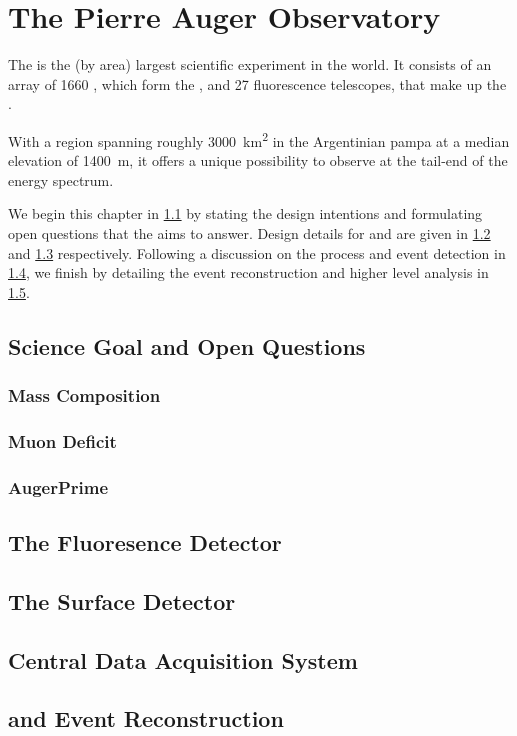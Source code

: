 
\chapter[The Pierre Auger Observatory]{The Pierre Auger Observatory}
\label{chap:pierre-auger-observatory}

The \PAO is the (by area) largest scientific experiment in the world. It 
consists of an array of 1660 \WCDs, which form the \SD, and 27 fluorescence 
telescopes, that make up the \FD.

With a region spanning roughly \SI{3000}{\kilo\meter\squared} in the Argentinian
pampa at a median elevation of \SI{1400}{\meter}, it offers a unique possibility
to observe \UHECRs at the tail-end of the \CR energy spectrum. 

We begin this chapter in \cref{sec:science-case} by stating the design 
intentions and formulating open questions that the \PAO aims to answer. Design
details for \FD and \SD are given in \cref{sec:fd} and \cref{sec:sd} 
respectively. Following a discussion on the \DAQ process and event detection in 
\cref{sec:cdas}, we finish by detailing the event reconstruction and higher 
level analysis in \cref{sec:rec}.

\section{Science Goal and Open Questions}
\label{sec:science-case}



\subsection{Mass Composition}

\blindtext

\subsection{Muon Deficit}

\blindtext

\subsection{AugerPrime}

\blindtext

\section{The Fluoresence Detector}
\label{sec:fd}

\blindtext

\section{The Surface Detector}
\label{sec:sd}

\blindtext

\section{Central Data Acquisition System}
\label{sec:cdas}

\blindtext

\section{\Offline and Event Reconstruction}
\label{sec:rec}

\blindtext
